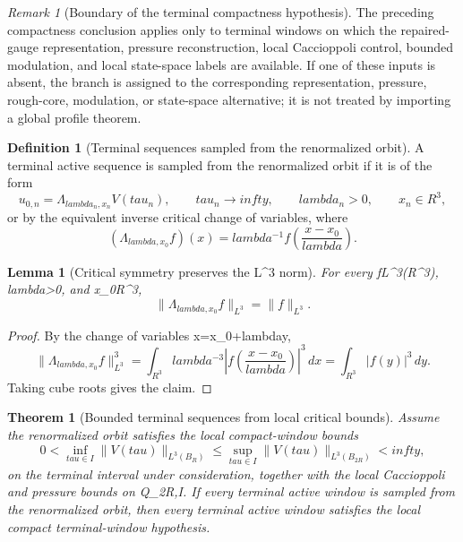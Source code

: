 \documentclass[11pt]{amsart}
\def\({}%
\def\){}%
\def\mathbb#1{#1}%
\def\tau{tau}%
\def\lambda{lambda}%
\def\infty{infty}%
\theoremstyle{plain}
\newtheorem{theorem}{Theorem}[section]
\newtheorem{lemma}[lemma]{Lemma}
\theoremstyle{definition}
\newtheorem{definition}[definition]{Definition}
\theoremstyle{remark}
\newtheorem{remark}[remark]{Remark}
\begin{document}
\begin{remark}[Boundary of the terminal compactness hypothesis]
\label{paper6a:rem:terminal-compactness-boundary}
The preceding compactness conclusion applies only to terminal windows on which
the repaired-gauge representation, pressure reconstruction, local Caccioppoli
control, bounded modulation, and local state-space labels are available.  If
one of these inputs is absent, the branch is assigned to the corresponding
representation, pressure, rough-core, modulation, or state-space alternative;
it is not treated by importing a global profile theorem.
\end{remark}

\begin{definition}[Terminal sequences sampled from the renormalized orbit]
\label{paper6a:def:terminal-sequences-sampled-from-orbit}
A terminal active sequence is sampled from the renormalized orbit if it is of
the form
\[
  u_{0,n}=\Lambda_{\lambda_n,x_n}V(\tau_n),
  \qquad
  \tau_n\to\infty,\qquad \lambda_n>0,\qquad x_n\in\mathbb R^3,
\]
or by the equivalent inverse critical change of variables, where
\[
  (\Lambda_{\lambda,x_0}f)(x)
  =
  \lambda^{-1}f\left(\frac{x-x_0}{\lambda}\right).
\]
\end{definition}

\begin{lemma}[Critical symmetry preserves the \(L^3\) norm]
\label{paper6a:lem:critical-symmetry-preserves-l3}
For every \(f\in L^3(\mathbb R^3)\), \(\lambda>0\), and
\(x_0\in\mathbb R^3\),
\[
  \|\Lambda_{\lambda,x_0}f\|_{L^3}=\|f\|_{L^3}.
\]
\end{lemma}

\begin{proof}
By the change of variables \(x=x_0+\lambda y\),
\[
  \|\Lambda_{\lambda,x_0}f\|_{L^3}^3
  =
  \int_{\mathbb R^3}\lambda^{-3}
  \left|f\left(\frac{x-x_0}{\lambda}\right)\right|^3\,dx
  =
  \int_{\mathbb R^3}|f(y)|^3\,dy .
\]
Taking cube roots gives the claim.
\end{proof}

\begin{theorem}[Bounded terminal sequences from local critical bounds]
\label{paper6a:thm:bounded-terminal-sequences-from-l3}
Assume the renormalized orbit satisfies the local compact-window bounds
\[
  0<\inf_{\tau\in I}\|V(\tau)\|_{L^3(B_R)}
  \le
  \sup_{\tau\in I}\|V(\tau)\|_{L^3(B_{2R})}
  <\infty,
\]
on the terminal interval under consideration, together with the local
Caccioppoli and pressure bounds on \(Q_{2R,I}\).  If every terminal active
window is sampled from the renormalized orbit, then every terminal active
window satisfies the local compact terminal-window hypothesis.
\end{theorem}
\end{document}

